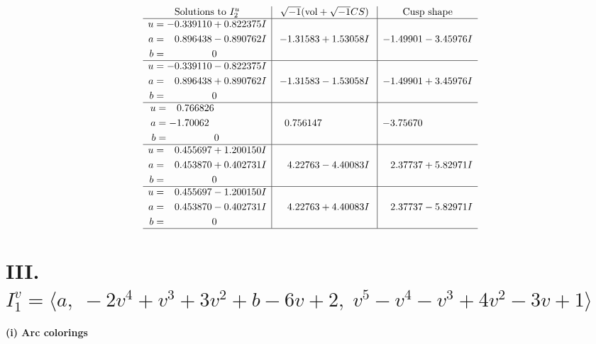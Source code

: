 \documentclass[1p]{elsarticle_modified}
\theoremstyle{definition}
\newcommand{\I}{\sqrt{-1}}
\begin{document}
$$\begin{array}{c|c|c}  
\text{Solutions to }I^u_{2}& \I (\text{vol} + \sqrt{-1}CS) & \text{Cusp shape}\\
 \hline 
\begin{aligned}
u &= -0.339110 + 0.822375 I \\
a &= \phantom{-}0.896438 - 0.890762 I \\
b &= \phantom{-0.000000 } 0\end{aligned}
 & -1.31583 + 1.53058 I & -1.49901 - 3.45976 I \\ \hline\begin{aligned}
u &= -0.339110 - 0.822375 I \\
a &= \phantom{-}0.896438 + 0.890762 I \\
b &= \phantom{-0.000000 } 0\end{aligned}
 & -1.31583 - 1.53058 I & -1.49901 + 3.45976 I \\ \hline\begin{aligned}
u &= \phantom{-}0.766826\phantom{ +0.000000I} \\
a &= -1.70062\phantom{ +0.000000I} \\
b &= \phantom{-0.000000 } 0\end{aligned}
 & \phantom{-}0.756147\phantom{ +0.000000I} & -3.75670\phantom{ +0.000000I} \\ \hline\begin{aligned}
u &= \phantom{-}0.455697 + 1.200150 I \\
a &= \phantom{-}0.453870 + 0.402731 I \\
b &= \phantom{-0.000000 } 0\end{aligned}
 & \phantom{-}4.22763 - 4.40083 I & \phantom{-}2.37737 + 5.82971 I \\ \hline\begin{aligned}
u &= \phantom{-}0.455697 - 1.200150 I \\
a &= \phantom{-}0.453870 - 0.402731 I \\
b &= \phantom{-0.000000 } 0\end{aligned}
 & \phantom{-}4.22763 + 4.40083 I & \phantom{-}2.37737 - 5.82971 I\\
 \hline 
 \end{array}$$\newpage\newpage\renewcommand{\arraystretch}{1}
\centering \section*{III. $I^v_{1}= \langle a,\;-2 v^4+v^3+3 v^2+b-6 v+2,\;v^5- v^4- v^3+4 v^2-3 v+1 \rangle$}
\flushleft \textbf{(i) Arc colorings}\\
\end{document}
